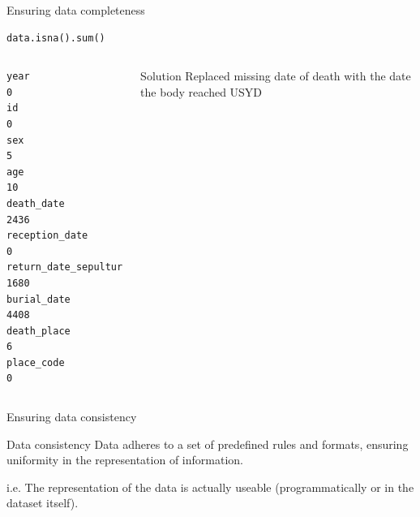 \documentclass[]{beamer}
\begin{document}
\begin{frame}[fragile]{Ensuring data completeness}

	\begin{lstlisting}
data.isna().sum()
	\end{lstlisting}

	\begin{columns}
			\begin{lstlisting}[style=output]
year                        0
id                          0
sex                         5
age                        10
death_date               2436
reception_date              0
return_date_sepulture    1680
burial_date              4408
death_place                 6
place_code                  0
			\end{lstlisting}
		\begin{exampleblock}{Solution}
			Replaced missing date of death with the date the body reached USYD
		\end{exampleblock}
	\end{columns}
\end{frame}

\begin{frame}[fragile]{Ensuring data consistency}

	\begin{block}{Data consistency}
		Data adheres to a set of predefined rules and formats, ensuring uniformity in the representation of information.
	\end{block}
	i.e. The representation of the data is actually useable (programmatically or in the dataset itself).

\end{frame}
\end{document}
